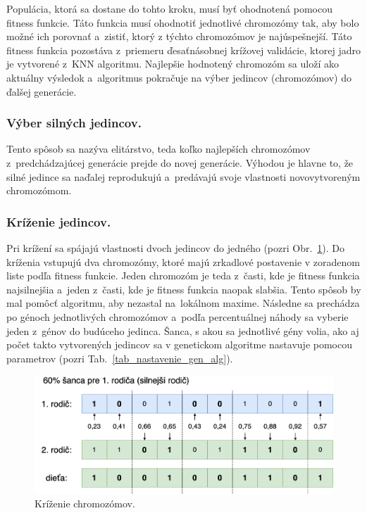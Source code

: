 \documentclass[runningheads]{llncs}
\begin{document}
Populácia, ktorá sa dostane do tohto kroku, musí byť ohodnotená pomocou fitness funkcie. 
Táto funkcia musí ohodnotiť jednotlivé chromozómy tak, aby bolo možné ich porovnať a~zistiť, ktorý
z týchto chromozómov je najúspešnejší. Táto fitness funkcia pozostáva z~priemeru ďesaťnásobnej krížovej validácie, ktorej jadro
je vytvorené z~KNN algoritmu. Najlepšie hodnotený chromozóm sa uloží ako aktuálny výsledok a~algoritmus pokračuje
na výber jedincov (chromozómov) do ďalšej generácie.

\subsubsection{Výber silných jedincov.}

Tento spôsob sa nazýva elitárstvo, teda koľko najlepších chromozómov z~predchádzajúcej generácie prejde
do novej generácie. Výhodou je hlavne to, že silné jedince sa naďalej reprodukujú a~predávajú svoje vlastnosti
novovytvoreným chromozómom.

\subsubsection{Kríženie jedincov.}

Pri krížení sa spájajú vlastnosti dvoch jedincov do jedného (pozri Obr.~\ref{fig_ga_krizenie}).
Do kríženia vstupujú dva chromozómy, ktoré majú zrkadlové postavenie v zoradenom liste podľa fitness funkcie. 
Jeden chromozóm je teda z~časti, kde je fitness funkcia najsilnejšia a~jeden z~časti, kde je fitness funkcia naopak slabšia. 
Tento spôsob by mal pomôcť algoritmu, aby nezastal na~lokálnom maxime. Následne sa prechádza po génoch 
jednotlivých chromozómov a~podľa percentuálnej náhody sa vyberie jeden z~génov do budúceho jedinca.
Šanca, s akou sa jednotlivé gény volia, ako aj počet takto vytvorených jedincov sa v genetickom algoritme
nastavuje pomocou parametrov (pozri Tab.~\ref{tab_nastavenie_gen_alg}). 

\begin{figure}
\includegraphics[width=\textwidth]{image/krizenie.png}
\caption{Kríženie chromozómov.} \label{fig_ga_krizenie}
\end{figure}
\end{document}
